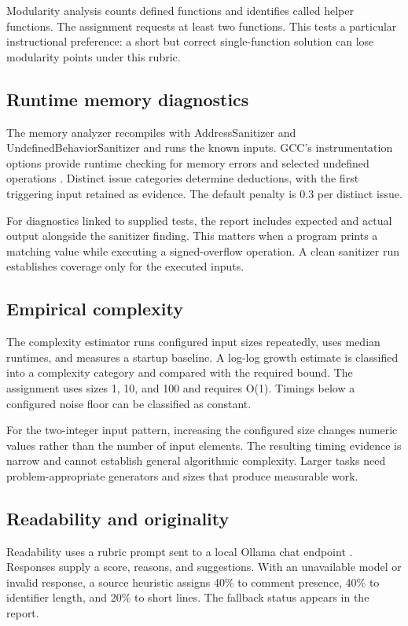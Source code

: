 \documentclass[conference]{IEEEtran}
\begin{document}
Modularity analysis counts defined functions and identifies called helper functions. The assignment requests at least two functions. This tests a particular instructional preference: a short but correct single-function solution can lose modularity points under this rubric.


\subsection{Runtime memory diagnostics}

The memory analyzer recompiles with AddressSanitizer and UndefinedBehaviorSanitizer and runs the known inputs. GCC's instrumentation options provide runtime checking for memory errors and selected undefined operations \cite{ref5}. Distinct issue categories determine deductions, with the first triggering input retained as evidence. The default penalty is 0.3 per distinct issue.


For diagnostics linked to supplied tests, the report includes expected and actual output alongside the sanitizer finding. This matters when a program prints a matching value while executing a signed-overflow operation. A clean sanitizer run establishes coverage only for the executed inputs.


\newpage

\subsection{Empirical complexity}

The complexity estimator runs configured input sizes repeatedly, uses median runtimes, and measures a startup baseline. A log-log growth estimate is classified into a complexity category and compared with the required bound. The assignment uses sizes 1, 10, and 100 and requires O(1). Timings below a configured noise floor can be classified as constant.


For the two-integer input pattern, increasing the configured size changes numeric values rather than the number of input elements. The resulting timing evidence is narrow and cannot establish general algorithmic complexity. Larger tasks need problem-appropriate generators and sizes that produce measurable work.


\subsection{Readability and originality}

Readability uses a rubric prompt sent to a local Ollama chat endpoint \cite{ref6}. Responses supply a score, reasons, and suggestions. With an unavailable model or invalid response, a source heuristic assigns 40\% to comment presence, 40\% to identifier length, and 20\% to short lines. The fallback status appears in the report.
\end{document}

